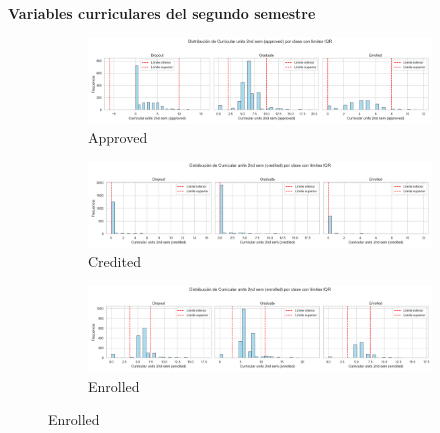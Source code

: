 \documentclass{report}[14pt]
\begin{document}
\textbf{Variables curriculares del segundo semestre} \\
\begin{figure}[htbp]
  \centering
  \begin{subfigure}[b]{.32\linewidth}
    \includegraphics[width=\linewidth]{distribution/Curricular units 2nd sem (approved)_distribution.png}
    \caption{Approved}\label{fig:approved2}
  \end{subfigure}\hfill
  \begin{subfigure}[b]{.32\linewidth}
    \includegraphics[width=\linewidth]{distribution/Curricular units 2nd sem (credited)_distribution.png}
    \caption{Credited}\label{fig:credited2}
  \end{subfigure}\hfill
  \begin{subfigure}[b]{.32\linewidth}
    \includegraphics[width=\linewidth]{distribution/Curricular units 2nd sem (enrolled)_distribution.png}
    \caption{Enrolled}\label{fig:enrolled2}
  \end{subfigure}

  \medskip  %


\end{figure}
\end{document}
